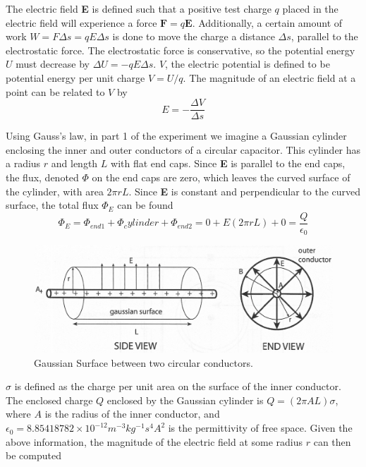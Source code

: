\documentclass[letterpaper]{article}
\begin{document}
The electric field \textbf{E} is defined such that a positive test charge $q$
placed in the electric field will experience a force $\textbf{F}=q\textbf{E}$.
Additionally, a certain amount of work $W=F \Delta s=qE\Delta s$ is done to move the charge
a distance $\Delta s$, parallel to the electrostatic force. The electrostatic force is
conservative, so the potential energy $U$ must decrease by $\Delta U=-qE\Delta s$.
$V$, the electric potential is defined to be potential energy per unit charge $V=U/q$.
The magnitude of an electric field at a point can be related to $V$ by
\begin{equation}
  E=-\frac{\Delta V}{\Delta s}
\end{equation}

Using Gauss's law, in part 1 of the experiment we imagine a Gaussian cylinder enclosing
the inner and outer conductors of a circular capacitor. This cylinder has a radius $r$ and
length $L$ with flat end caps. Since \textbf{E} is parallel to the end caps, the flux, denoted $\Phi$ on
the end caps are zero, which leaves the curved surface of the cylinder, with area $2\pi rL$.
Since \textbf{E} is constant and perpendicular to the curved surface, the total flux $\Phi_E$ can be found
\begin{equation}
  \Phi_E = \Phi_{end1} + \Phi_cylinder + \Phi_{end2} = 0+E(2\pi rL) + 0 =\frac{Q}{\epsilon_0}
\end{equation}
\begin{figure}[H]
    \centering
    \includegraphics[width=\textwidth]{fig1.jpg}
    \caption{Gaussian Surface between two circular conductors. \cite{labmanual}}
\end{figure}

$\sigma$ is defined as the charge per unit area on the surface of the inner conductor.
The enclosed charge $Q$ enclosed by the Gaussian cylinder is $Q=(2 \pi AL)\sigma$, where
$A$ is the radius of the inner conductor, and $\epsilon_0=8.85418782 \times 10^{-12} m^{-3} kg^{-1} s^{4} A^{2}$ is the permittivity of free space.
Given the above information, the magnitude of the electric field at some radius $r$
can then be computed
\end{document}
